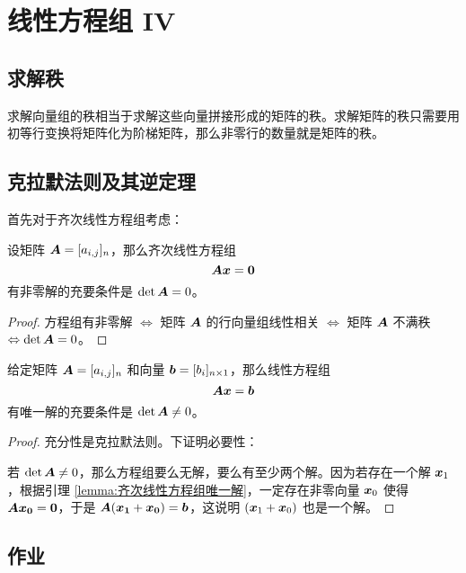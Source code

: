\section{线性方程组 IV}

\subsection{求解秩}

求解向量组的秩相当于求解这些向量拼接形成的矩阵的秩。求解矩阵的秩只需要用初等行变换将矩阵化为阶梯矩阵，那么非零行的数量就是矩阵的秩。

\subsection{克拉默法则及其逆定理}

首先对于齐次线性方程组考虑：

\begin{lemma} \label{lemma:齐次线性方程组唯一解}
	设矩阵 $\boldsymbol{A} = [a_{i,j}]_n$，那么齐次线性方程组
	$$
	\boldsymbol{A} \boldsymbol{x} = \boldsymbol{0}
	$$
	有非零解的充要条件是 $\det \boldsymbol{A} = 0$。

	\begin{proof}
		方程组有非零解 $\Leftrightarrow$ 矩阵 $\boldsymbol{A}$ 的行向量组线性相关 $\Leftrightarrow$ 矩阵 $\boldsymbol{A}$ 不满秩 $\Leftrightarrow \det \boldsymbol{A} = 0$。
	\end{proof}
\end{lemma}

\begin{theorem}[克拉默法则及其逆定理]
	给定矩阵 $\boldsymbol{A} = [a_{i,j}]_n$ 和向量 $\boldsymbol{b} = [b_i]_{n \times 1}$，那么线性方程组
	$$
	\boldsymbol{A} \boldsymbol{x} = \boldsymbol{b}
	$$
	有唯一解的充要条件是 $\det \boldsymbol{A} \neq 0$。

	\begin{proof}
		充分性是克拉默法则。下证明必要性：

		若 $\det \boldsymbol{A} \neq 0$，那么方程组要么无解，要么有至少两个解。因为若存在一个解 $\boldsymbol{x}_1$，根据引理 \ref{lemma:齐次线性方程组唯一解}，一定存在非零向量 $\boldsymbol{x}_0$ 使得 $\boldsymbol{A} \boldsymbol{x_0} = \boldsymbol{0}$，于是 $\boldsymbol{A} (\boldsymbol{x_1} + \boldsymbol{x_0}) = \boldsymbol{b}$，这说明 $(\boldsymbol{x}_1 + \boldsymbol{x}_0)$ 也是一个解。
	\end{proof}
\end{theorem}

\subsection{作业}

